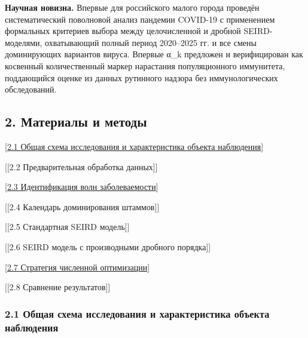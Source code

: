 \documentclass[12pt]{article}
\begin{document}
\textbf{Научная новизна.} Впервые для российского малого города проведён
систематический поволновой анализ пандемии COVID-19 с применением
формальных критериев выбора между целочисленной и дробной
SEIRD-моделями, охватывающий полный период 2020--2025 гг. и все смены
доминирующих вариантов вируса. Впервые α\_k предложен и верифицирован
как косвенный количественный маркер нарастания популяционного
иммунитета, поддающийся оценке из данных рутинного надзора без
иммунологических обследований.

\subsection{2. Материалы и
методы}\label{ux43cux430ux442ux435ux440ux438ux430ux43bux44b-ux438-ux43cux435ux442ux43eux434ux44b}

{[}\hyperref[ux43eux431ux449ux430ux44f-ux441ux445ux435ux43cux430-ux438ux441ux441ux43bux435ux434ux43eux432ux430ux43dux438ux44f-ux438-ux445ux430ux440ux430ux43aux442ux435ux440ux438ux441ux442ux438ux43aux430-ux43eux431ux44aux435ux43aux442ux430-ux43dux430ux431ux43bux44eux434ux435ux43dux438ux44f]{2.1
Общая схема исследования и характеристика объекта наблюдения}{]}

{[}{[}2.2 Предварительная обработка данных{]}{]}

{[}\hyperref[ux438ux434ux435ux43dux442ux438ux444ux438ux43aux430ux446ux438ux44f-ux432ux43eux43bux43d-ux437ux430ux431ux43eux43bux435ux432ux430ux435ux43cux43eux441ux442ux438]{2.3
Идентификация волн заболеваемости}{]}

{[}{[}2.4 Календарь доминирования штаммов{]}{]}

{[}{[}2.5 Стандартная SEIRD модель{]}{]}

{[}{[}2.6 SEIRD модель с производными дробного порядка{]}{]}

{[}\hyperref[ux441ux442ux440ux430ux442ux435ux433ux438ux44f-ux447ux438ux441ux43bux435ux43dux43dux43eux439-ux43eux43fux442ux438ux43cux438ux437ux430ux446ux438ux438]{2.7
Стратегия численной оптимизации}{]}

{[}{[}2.8 Сравнение результатов{]}{]}

\subsubsection{2.1 Общая схема исследования и характеристика объекта
наблюдения}\label{ux43eux431ux449ux430ux44f-ux441ux445ux435ux43cux430-ux438ux441ux441ux43bux435ux434ux43eux432ux430ux43dux438ux44f-ux438-ux445ux430ux440ux430ux43aux442ux435ux440ux438ux441ux442ux438ux43aux430-ux43eux431ux44aux435ux43aux442ux430-ux43dux430ux431ux43bux44eux434ux435ux43dux438ux44f}
\end{document}
